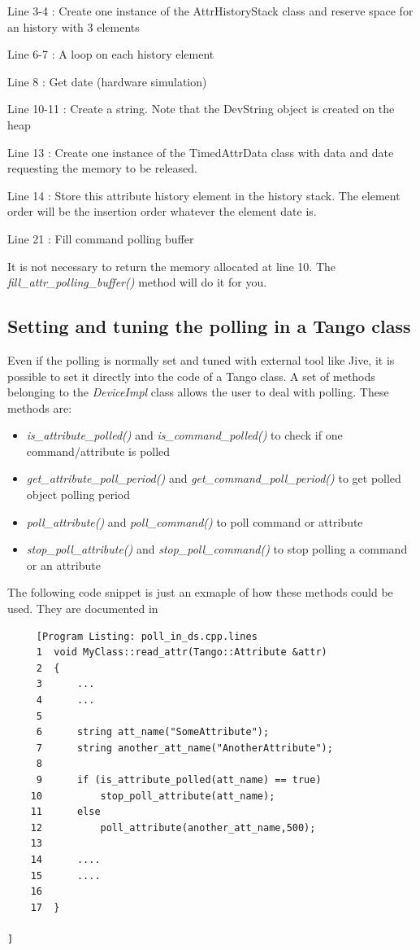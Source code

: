 Line 3-4 : Create one instance of the AttrHistoryStack class and reserve
space for an history with 3 elements

Line 6-7 : A loop on each history element

Line 8 : Get date (hardware simulation)

Line 10-11 : Create a string. Note that the DevString object is created
on the heap

Line 13 : Create one instance of the TimedAttrData class with data
and date requesting the memory to be released.

Line 14 : Store this attribute history element in the history stack.
The element order will be the insertion order whatever the element
date is.

Line 21 : Fill command polling buffer

It is not necessary to return the memory allocated at line 10. The
\emph{fill\_attr\_polling\_buffer()} method will do it for you.


\subsection{Setting and tuning the polling in a Tango class}

Even if the polling is normally set and tuned with external tool like
Jive, it is possible to set it directly into the code of a Tango class.
A set of methods belonging to the \emph{DeviceImpl} class allows the
user to deal with polling. These methods are:
\begin{itemize}
\item \emph{is\_attribute\_polled()} and \emph{is\_command\_polled()} to
check if one command/attribute is polled
\item \emph{get\_attribute\_poll\_period()} and \emph{get\_command\_poll\_period()}
to get polled object polling period
\item \emph{poll\_attribute()} and \emph{poll\_command()} to poll command
or attribute
\item \emph{stop\_poll\_attribute()} and \emph{stop\_poll\_command()} to
stop polling a command or an attribute
\end{itemize}
The following code snippet is just an exmaple of how these methods
could be used. They are documented in \cite{Tango-dsclasses-doc}


\begin{verbatim}
     [Program Listing: poll_in_ds.cpp.lines
     1	void MyClass::read_attr(Tango::Attribute &attr)
     2	{
     3	    ...
     4	    ...
     5	    
     6	    string att_name("SomeAttribute");
     7	    string another_att_name("AnotherAttribute");
     8	
     9	    if (is_attribute_polled(att_name) == true)
    10	        stop_poll_attribute(att_name);
    11	    else
    12	        poll_attribute(another_att_name,500); 
    13	    
    14	    ....
    15	    ....
    16	    
    17	}

]
\end{verbatim}



